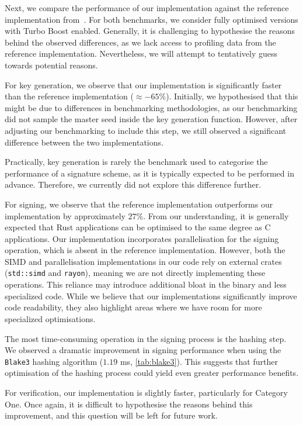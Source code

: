 \documentclass[11pt]{report}
\theoremstyle{definition}
\theoremstyle{plain}
\begin{document}
Next, we compare the performance of our implementation against the reference implementation from~\cite{aguilarsyndrome11}. For both benchmarks, we consider fully optimised versions with Turbo Boost enabled. Generally, it is challenging to hypothesise the reasons behind the observed differences, as we lack access to profiling data from the reference implementation. Nevertheless, we will attempt to tentatively guess towards potential reasons.

For key generation, we observe that our implementation is significantly faster than the reference implementation ($\approx -65\%$). Initially, we hypothesised that this might be due to differences in benchmarking methodologies, as our benchmarking did not sample the master seed inside the key generation function. However, after adjusting our benchmarking to include this step, we still observed a significant difference between the two implementations. 

Practically, key generation is rarely the benchmark used to categorise the performance of a signature scheme, as it is typically expected to be performed in advance. Therefore, we currently did not explore this difference further.

For signing, we observe that the reference implementation outperforms our implementation by approximately $27\%$. From our understanding, it is generally expected that Rust applications can be optimised to the same degree as C applications. Our implementation incorporates parallelisation for the signing operation, which is absent in the reference implementation. However, both the SIMD and parallelisation implementations in our code rely on external crates (\texttt{std::simd} and \texttt{rayon}), meaning we are not directly implementing these operations. This reliance may introduce additional bloat in the binary and less specialized code. While we believe that our implementations significantly improve code readability, they also highlight areas where we have room for more specialized optimisations. 

The most time-consuming operation in the signing process is the hashing step. We observed a dramatic improvement in signing performance when using the \texttt{Blake3} hashing algorithm ($1.19$ ms, \autoref{tab:blake3}). This suggests that further optimisation of the hashing process could yield even greater performance benefits.

For verification, our implementation is slightly faster, particularly for Category One. Once again, it is difficult to hypothesise the reasons behind this improvement, and this question will be left for future work.
\end{document}
